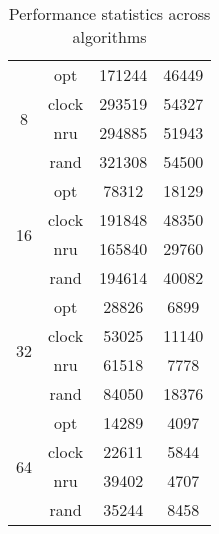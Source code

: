 \documentclass[letterpaper]{article}
\begin{document}
\begin{table}
\begin{multicols}{2}
\begin{tabular}{|c|c|c|c|}
\multirow{4}{*}{8}  & opt   & 171244      & 46449       \\ \cline{2-4} 
                    & clock & 293519      & 54327       \\ \cline{2-4} 
                    & nru   & 294885      & 51943       \\ \cline{2-4} 
                    & rand  & 321308      & 54500       \\ \hline
\multirow{4}{*}{16} & opt   & 78312       & 18129       \\ \cline{2-4} 
                    & clock & 191848      & 48350       \\ \cline{2-4} 
                    & nru   & 165840      & 29760       \\ \cline{2-4} 
                    & rand  & 194614      & 40082       \\ \hline
\multirow{4}{*}{32} & opt   & 28826       & 6899        \\ \cline{2-4} 
                    & clock & 53025       & 11140       \\ \cline{2-4} 
                    & nru   & 61518       & 7778        \\ \cline{2-4} 
                    & rand  & 84050       & 18376       \\ \hline
\multirow{4}{*}{64} & opt   & 14289       & 4097        \\ \cline{2-4} 
                    & clock & 22611       & 5844        \\ \cline{2-4} 
                    & nru   & 39402       & 4707        \\ \cline{2-4} 
                    & rand  & 35244       & 8458        \\ \hline
\end{tabular}\smallbreak
{}
\end{multicols}
\caption{Performance statistics across algorithms}\label{tbl:algo}
\end{table}\noindent
\end{document}
